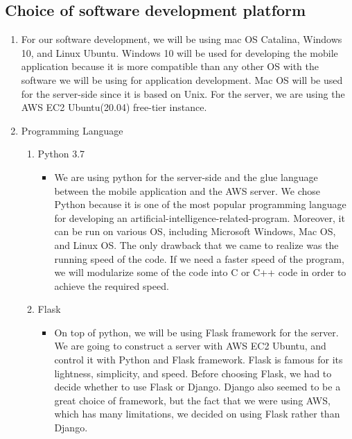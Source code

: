 \documentclass[conference]{IEEEtran}
\begin{document}
\subsection{Choice of software development platform}
\begin{enumerate}
    \item For our software development, we will be using mac OS Catalina, Windows 10, and Linux Ubuntu. Windows 10 will be used for developing the mobile application because it is more compatible than any other OS with the software we will be using for application development. Mac OS will be used for the server-side since it is based on Unix. For the server, we are using the AWS EC2 Ubuntu(20.04) free-tier instance.
    \item Programming Language
    \begin{enumerate}
    \item Python 3.7
        \begin{itemize}
            \item We are using python for the server-side and the glue language between the mobile application and the AWS server. We chose Python because it is one of the most popular programming language for developing an artificial-intelligence-related-program. Moreover, it can be run on various OS, including Microsoft Windows, Mac OS, and Linux OS. The only drawback that we came to realize was the running speed of the code. If we need a faster speed of the program, we will modularize some of the code into C or C++ code in order to achieve the required speed.
        \end{itemize}
    \item Flask
        \begin{itemize}
            \item On top of python, we will be using Flask framework for the server. We are going to construct a server with AWS EC2 Ubuntu, and control it with Python and Flask framework. Flask is famous for its lightness, simplicity, and speed. Before choosing Flask, we had to decide whether to use Flask or Django. Django also seemed to be a great choice of framework, but the fact that we were using AWS, which has many limitations, we decided on using Flask rather than Django.
        \end{itemize}

\end{enumerate}
\end{enumerate}
\end{document}
